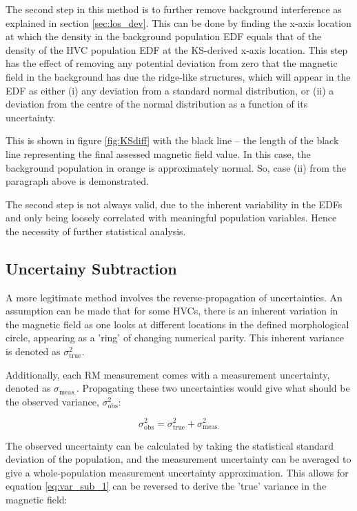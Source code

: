 The second step in this method is to further remove background interference as explained in section \ref{sec:los_dev}. This can be done by finding the x-axis location at which the density in the background population EDF equals that of the density of the HVC population EDF at the KS-derived x-axis location. This step has the effect of removing any potential deviation from zero that the magnetic field in the background has due the ridge-like structures, which will appear in the EDF as either (i) any deviation from a standard normal distribution, or (ii) a deviation from the centre of the normal distribution as a function of its uncertainty.


This is shown in figure \ref{fig:KSdiff} with the black line – the length of the black line representing the final assessed magnetic field value. In this case, the background population in orange is approximately normal. So, case (ii) from the paragraph above is demonstrated.


The second step is not always valid, due to the inherent variability in the EDFs and only being loosely correlated with meaningful population variables. Hence the necessity of further statistical analysis.


\subsection{Uncertainy Subtraction}
\label{ssec:sigma_sub}

A more legitimate method involves the reverse-propagation of uncertainties. An assumption can be made that for some HVCs, there is an inherent variation in the magnetic field as one looks at different locations in the defined morphological circle, appearing as a 'ring' of changing numerical parity. This inherent variance is denoted as $\sigma_{\mathrm{true}}^2$.


Additionally, each RM measurement comes with a measurement uncertainty, denoted as $\sigma_{\mathrm{meas.}}$. Propagating these two uncertainties would give what should be the observed variance, $\sigma_{\mathrm{obs}}^2$:


\begin{equation}
    \sigma_{\mathrm{obs}}^2 = \sigma_{\mathrm{true}}^2 + \sigma_{\mathrm{meas.}}^2
\label{eq:var_sub_1}
\end{equation}


The observed uncertainty can be calculated by taking the statistical standard deviation of the population, and the measurement uncertainty can be averaged to give a whole-population measurement uncertainty approximation. This allows for equation \ref{eq:var_sub_1} can be reversed to derive the 'true' variance in the magnetic field:


